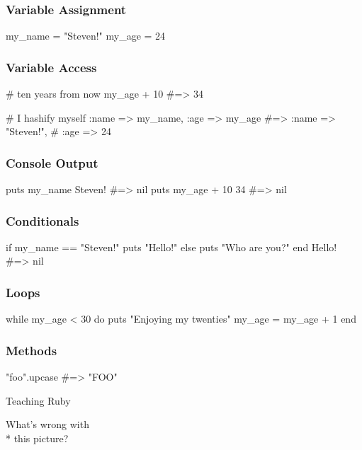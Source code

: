 \documentclass[20pt]{beamer}
\begin{document}
\begin{frame}[fragile]
\frametitle{Variable Assignment}
\begin{rubycode}
my_name = "Steven!"
my_age = 24
\end{rubycode}
\end{frame}

\begin{frame}[fragile]
\frametitle{Variable Access}
\begin{rubycode}
# ten years from now
my_age + 10 #=> 34

# I hashify myself
{ :name => my_name,
  :age => my_age }
#=> {:name => "Steven!",
#    :age => 24}
\end{rubycode}
\end{frame}

\begin{frame}[fragile]
\frametitle{Console Output}
\begin{rubycode}
puts my_name
Steven!
#=> nil
puts my_age + 10
34
#=> nil
\end{rubycode}
\end{frame}

\begin{frame}[fragile]
\frametitle{Conditionals}
\begin{rubycode}
if my_name == "Steven!"
  puts "Hello!"
else
  puts "Who are you?"
end
Hello!
#=> nil
\end{rubycode}
\end{frame}

\begin{frame}[fragile]
\frametitle{Loops}
\begin{rubycode}
while my_age < 30 do
  puts "Enjoying my twenties"
  my_age = my_age + 1
end
\end{rubycode}
\end{frame}

\begin{frame}[fragile]
\frametitle{Methods}
\begin{rubycode}
"foo".upcase #=> "FOO"
\end{rubycode}
\end{frame}

{
\begin{frame}
\par { Teaching Ruby}\par
\vspace{3cm}\hfill
{What's wrong with\\* \hfill this picture?}
\end{frame}
}
\end{document}
